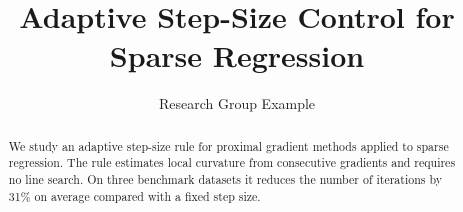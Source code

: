 \documentclass[11pt]{article}
\title{Adaptive Step-Size Control for Sparse Regression}
\author{Research Group Example}
\date{}
\begin{document}
\maketitle

\begin{abstract}
We study an adaptive step-size rule for proximal gradient methods applied to
sparse regression. The rule estimates local curvature from consecutive
gradients and requires no line search. On three benchmark datasets it reduces
the number of iterations by 31\% on average compared with a fixed step size.
\end{abstract}








\end{document}
